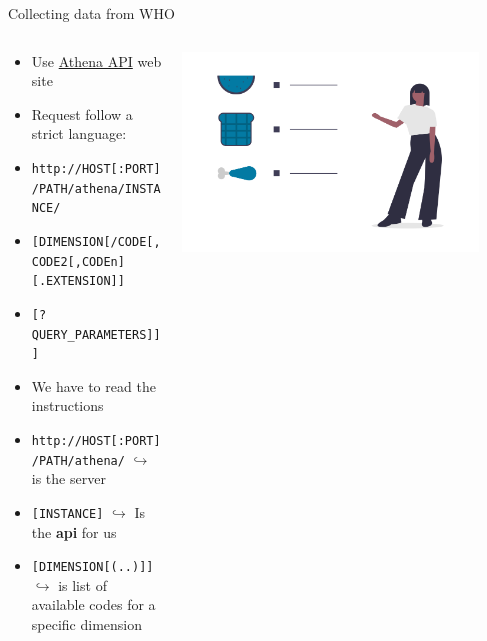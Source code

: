 \documentclass[xcolor=x11names,compress]{beamer}
\renewcommand{\(}{\begin{columns}}
\renewcommand{\)}{\end{columns}}
\newcommand{\<}[1]{\begin{column}{#1}}
\renewcommand{\>}{\end{column}}
\begin{document}
\begin{frame}{Collecting data from WHO}
\begin{columns}[T]
  \begin{column}{0.8\textwidth}
    \begin{itemize}[<+->]
        \item Use \href{https://www.who.int/data/gho/info/athena-api}{Athena API} web site
        \item Request follow a strict language:
        \item[] \small{\texttt{http://HOST[:PORT]/PATH/athena/INSTANCE/}}
        \item[] \small{\texttt{[DIMENSION[/CODE[,CODE2[,CODEn][.EXTENSION]]}}
        \item[] \small{\texttt{[?QUERY\_PARAMETERS]]]}}
        \item We have to read the instructions
        \item[ ] \small{\texttt{http://HOST[:PORT]/PATH/athena/}} $\hookrightarrow$ is the server
        \item[]\small{\texttt{[INSTANCE]}} $\hookrightarrow$ Is the \textbf{api} for us
        \item[]\small{\texttt{[DIMENSION[(..)]]}} $\hookrightarrow$ is list of available codes for a specific dimension
     \end{itemize}
     \end{column}

    \begin{column}{0.2\textwidth}
    \begin{center}
      \includegraphics[width=0.9\textwidth]{undraw_diet_ghvw.png}
    \end{center}
    \end{column}
\end{columns}
\end{frame}
\end{document}
